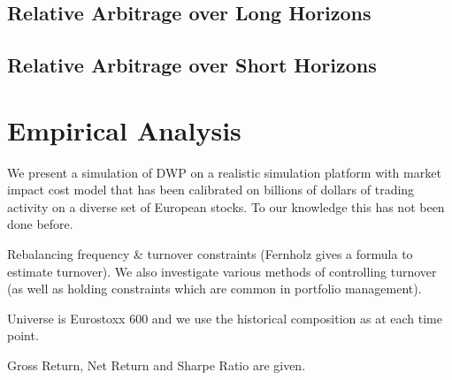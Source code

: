 \documentclass[british]{amsart} \usepackage{lmodern}
\numberwithin{equation}{section} \numberwithin{figure}{section}
\theoremstyle{plain} \newtheorem{thm}{\protect\theoremname}[section]
\theoremstyle{definition} \newtheorem{defn}[thm]{\protect\definitionname}
\theoremstyle{plain} \newtheorem{assumption}[thm]{\protect\assumptionname}
\theoremstyle{plain} \newtheorem{lem}[thm]{\protect\lemmaname}
\theoremstyle{plain} \newtheorem{prop}[thm]{\protect\propositionname}
\theoremstyle{remark} \newtheorem{rem}[thm]{\protect\remarkname}
\theoremstyle{plain} \newtheorem{cor}[thm]{\protect\corollaryname}
\begin{document}
\subsection{Relative Arbitrage over Long Horizons}

\subsection{Relative Arbitrage over Short Horizons}

\newpage
\section{Empirical Analysis}

We present a simulation of DWP  on a realistic simulation platform
with market impact cost model that has been calibrated on billions
of dollars of trading activity on a diverse set of European stocks.
To our knowledge this has not been done before. 

Rebalancing frequency \& turnover constraints (Fernholz gives a formula
to estimate turnover). We also investigate various methods of controlling
turnover (as well as holding constraints which are common in portfolio
management).

Universe is Eurostoxx 600 and we use the historical composition as
at each time point.

Gross Return, Net Return and Sharpe Ratio are given.


\newpage
\printbibliography
\end{document}
